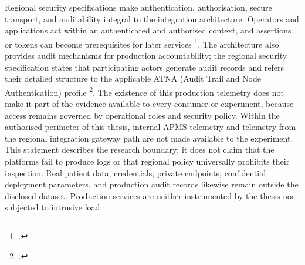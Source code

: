 \noindent Regional security specifications make authentication, authorisation, secure
transport, and auditability integral to the integration architecture. Operators
and applications act within an authenticated and authorised context, and
assertions or tokens can become prerequisites for later services
\footcites[Version~1.4.1]{apms-auth-v141}{arsenal-security-v214,arsenal-context-rve-v13}. The
architecture also provides audit mechanisms for production accountability; the
regional security specification states that participating actors generate audit
records and refers their detailed structure to the applicable ATNA (Audit Trail
and Node Authentication) profile
\footcite[Section~4.3.15]{arsenal-security-v214}. The existence of this production
telemetry does not make it part of the evidence available to every consumer or
experiment, because access remains governed by operational roles and security
policy. Within the authorised perimeter of this thesis, internal APMS telemetry
and telemetry from the regional integration gateway path are not made available to the
experiment. This statement describes the
research boundary; it does not claim that the platforms fail to produce logs or
that regional policy universally prohibits their inspection. Real patient data,
credentials, private endpoints, confidential deployment parameters, and
production audit records likewise remain outside the disclosed dataset.
Production services are neither instrumented by the thesis nor subjected to
intrusive load.

